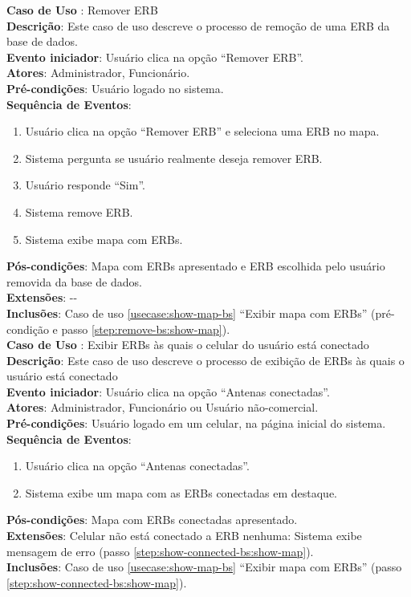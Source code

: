 \documentclass[]{politex}
\begin{document}
\noindent \textbf{Caso de Uso }: Remover ERB \\
\textbf{Descrição}: Este caso de uso descreve o processo de remoção de uma ERB da
base de dados. \\
\textbf{Evento iniciador}: Usuário clica na opção ``Remover ERB''. \\
\textbf{Atores}: Administrador, Funcionário. \\
\textbf{Pré-condições}: Usuário logado no sistema. \\
\textbf{Sequência de Eventos}:
\begin{enumerate}
\item Usuário clica na opção ``Remover ERB'' e seleciona uma ERB no mapa.
\item Sistema pergunta se usuário realmente deseja remover ERB.
\item Usuário responde ``Sim''.
\item Sistema remove ERB.
\item\label{step:remove-bs:show-map} Sistema exibe mapa com ERBs.
\end{enumerate}
\textbf{Pós-condições}: Mapa com ERBs apresentado e ERB escolhida pelo usuário
removida da base de dados. \\
\textbf{Extensões}: -{}- \\
\textbf{Inclusões}: Caso de uso \ref{usecase:show-map-bs} ``Exibir mapa com ERBs'' (pré-condição e passo \ref{step:remove-bs:show-map}). \\

\noindent \textbf{Caso de Uso }: Exibir ERBs às quais o celular do usuário está
conectado \\
\textbf{Descrição}: Este caso de uso descreve o processo de exibição de ERBs às
quais o usuário está conectado \\
\textbf{Evento iniciador}: Usuário clica na opção ``Antenas conectadas''. \\
\textbf{Atores}: Administrador, Funcionário ou Usuário não-comercial. \\
\textbf{Pré-condições}: Usuário logado em um celular, na página inicial do
sistema. \\
\textbf{Sequência de Eventos}:
\begin{enumerate}
\item Usuário clica na opção ``Antenas conectadas''.
\item\label{step:show-connected-bs:show-map} Sistema exibe um mapa com as ERBs conectadas em destaque.
\end{enumerate}
\textbf{Pós-condições}: Mapa com ERBs conectadas apresentado. \\
\textbf{Extensões}: Celular não está conectado a ERB nenhuma: Sistema exibe
mensagem de erro (passo \ref{step:show-connected-bs:show-map}). \\
\textbf{Inclusões}: Caso de uso \ref{usecase:show-map-bs} ``Exibir mapa com ERBs'' (passo \ref{step:show-connected-bs:show-map}). \\
\end{document}
